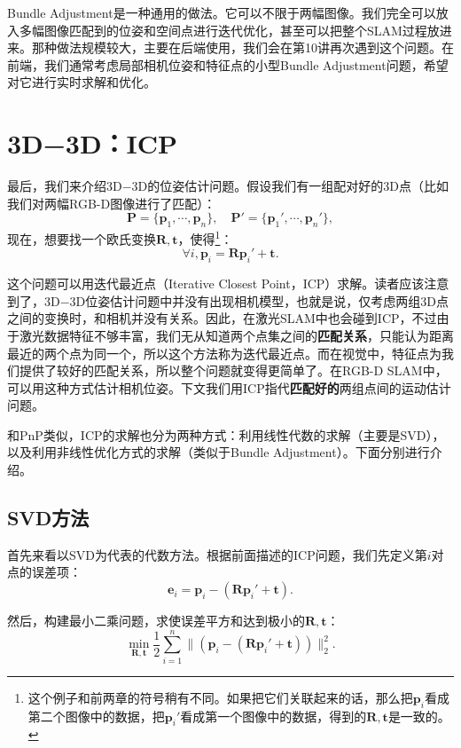 Bundle Adjustment是一种通用的做法。它可以不限于两幅图像。我们完全可以放入多幅图像匹配到的位姿和空间点进行迭代优化，甚至可以把整个SLAM过程放进来。那种做法规模较大，主要在后端使用，我们会在第10讲再次遇到这个问题。在前端，我们通常考虑局部相机位姿和特征点的小型Bundle Adjustment问题，希望对它进行实时求解和优化。

\section{3D−3D：ICP}
最后，我们来介绍3D−3D的位姿估计问题。假设我们有一组配对好的3D点（比如我们对两幅RGB-D图像进行了匹配）：
\[
\bm{P} = \{ \bm{p}_1, \cdots, \bm{p}_n \}, \quad \bm{P}' = \{ \bm{p}_1', \cdots, \bm{p}_n'\},
\]
现在，想要找一个欧氏变换$\bm{R}, \bm{t}$，使得\footnote{这个例子和前两章的符号稍有不同。如果把它们关联起来的话，那么把$\bm{p}_i$看成第二个图像中的数据，把$\bm{p}_i'$看成第一个图像中的数据，得到的$\bm{R},\bm{t}$是一致的。}：
\[
\forall i, \bm{p}_i = \bm{R} \bm{p}_i' + \bm{t}.
\]

这个问题可以用迭代最近点（Iterative Closest Point，ICP）求解。读者应该注意到了，3D−3D位姿估计问题中并没有出现相机模型，也就是说，仅考虑两组3D点之间的变换时，和相机并没有关系。因此，在激光SLAM中也会碰到ICP，不过由于激光数据特征不够丰富，我们无从知道两个点集之间的\textbf{匹配关系}，只能认为距离最近的两个点为同一个，所以这个方法称为迭代最近点。而在视觉中，特征点为我们提供了较好的匹配关系，所以整个问题就变得更简单了。在RGB-D SLAM中，可以用这种方式估计相机位姿。下文我们用ICP指代\textbf{匹配好的}两组点间的运动估计问题。

和PnP类似，ICP的求解也分为两种方式：利用线性代数的求解（主要是SVD）， 以及利用非线性优化方式的求解（类似于Bundle Adjustment）。下面分别进行介绍。

\subsection{SVD方法}
首先来看以SVD为代表的代数方法。根据前面描述的ICP问题，我们先定义第$i$对点的误差项：
\begin{equation}
\bm{e}_i = \bm{p}_i - (\bm{R} \bm{p}_i' + \bm{t} ) .
\end{equation}

然后，构建最小二乘问题，求使误差平方和达到极小的$\bm{R}, \bm{t}$：
\begin{equation}
\mathop {\min }\limits_{\bm{R}, \bm{t}} \frac{1}{2} \sum\limits_{i = 1}^n\| {\left( {{\bm{p}_i} - \left( {\bm{R}{\bm{p}_i}' + \bm{t}} \right)} \right)} \|^2_2.
\end{equation}

